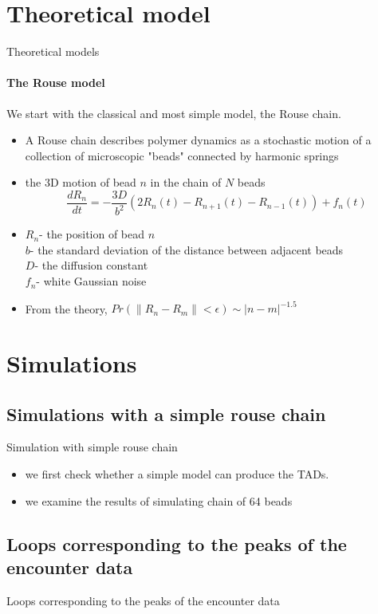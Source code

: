 \documentclass[8pt]{beamer}
\begin{document}
\section{Theoretical model}
\begin{frame}{Theoretical models}
\framesubtitle{The Rouse model}
We start with the classical and most simple model, the Rouse chain.
\begin{itemize}
\item A Rouse chain describes polymer dynamics as a stochastic motion of a collection of microscopic "beads" connected by harmonic springs
\item the 3D  motion of bead $n$ in the chain of $N$ beads 
\begin{equation*}
\frac{dR_n}{dt} = -\frac{3D}{b^2}(2R_n(t)-R_{n+1}(t)-R_{n-1}(t))+f_n(t)
\end{equation*}
\item $R_n$- the position of bead $n$\\
$b$- the standard deviation of the distance between adjacent beads\\
$D$- the diffusion constant\\
$f_n$- white Gaussian noise
\item From the theory, $Pr(\|R_n-R_m\|<\epsilon)\sim  |n-m|^{-1.5}$
\end{itemize}
\end{frame}

\section{Simulations}
\subsection{Simulations with a simple rouse chain}
\begin{frame}{Simulation with simple rouse chain}
\begin{itemize}
\item we first check whether a simple model can produce the TADs. 
\item we examine the results of simulating  chain of 64 beads
\end{itemize}

\end{frame}

\subsection{Loops corresponding to the peaks of the encounter data}
\begin{frame}{Loops corresponding to the peaks of the encounter data}

\end{frame}
\end{document}
